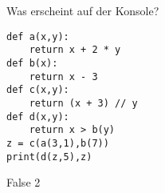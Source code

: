 \question[4] Was erscheint auf der Konsole?  
\begin{lstlisting}
def a(x,y):
    return x + 2 * y
def b(x):
    return x - 3
def c(x,y):
    return (x + 3) // y
def d(x,y):
    return x > b(y)
z = c(a(3,1),b(7))
print(d(z,5),z)
\end{lstlisting}
\begin{solutionbox}{1cm}
False 2
\end{solutionbox}
